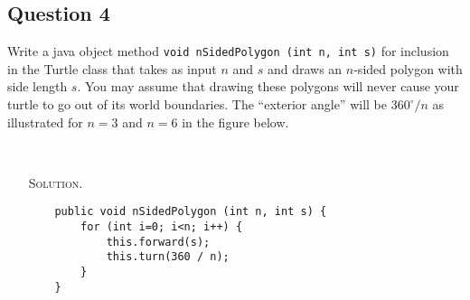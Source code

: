 \documentclass[12pt]{report}
\begin{document}
\clearpage
\subsection*{Question 4}
Write a java object method \texttt{void nSidedPolygon (int n, int s)} for inclusion in the Turtle class that takes as input $n$ and $s$ and draws an $n$-sided polygon with side length $s$. 
You may assume that drawing these polygons will never cause  your turtle
to go out of its world boundaries. 
The ``exterior angle'' will be ${360^{\circ}}/{n}$ as illustrated for $n=3$ and $n=6$ in the figure below. \\
\begin{center}
\\
\end{center}

\begin{enumerate}
\item[\textsc{Solution.}] \blank
\begin{verbatim}
    public void nSidedPolygon (int n, int s) {
        for (int i=0; i<n; i++) {
            this.forward(s);
            this.turn(360 / n);
        }
    } 
\end{verbatim}

\end{enumerate}
\end{document}
